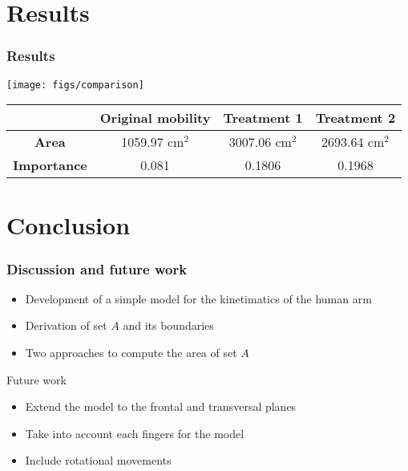 \documentclass{beamer}
\begin{document}
\section{Results}


\begin{frame}
\frametitle{Results}

\begin{center}
\texttt{[image: figs/comparison]}
\end{center}


\begin{table}[!h]
\begin{center}
\begin{tabular}{|c|c|c|c|}
\hline
 & \bf Original mobility & \bf Treatment 1& \bf Treatment 2 \\  \hline
 \bf Area &1059.97 cm$^2$ & 3007.06 cm$^2$ &   2693.64 cm$^2$ \\ \hline
 \bf Importance & 0.081 &   0.1806 &   0.1968 \\ \hline
\end{tabular}
\end{center}
\end{table}

\end{frame}


\section{Conclusion}

\begin{frame}
\frametitle{Discussion and future work}
\begin{block}{}
\begin{itemize}
\item Development of a simple model for the kinetimatics of the human arm
\item Derivation of set $A$ and its boundaries
\item Two approaches to compute the area of set $A$
\end{itemize}
\end{block}

\begin{block}{Future work}
\begin{itemize}
\item Extend the model to the frontal and transversal planes
\item Take into account each fingers for the model
\item Include rotational movements
\end{itemize}
\end{block}
\end{frame}
\end{document}
